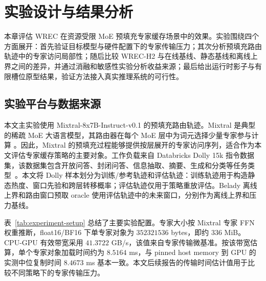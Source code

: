 \cleardoublepage


\makeatletter
{}
\makeatother

\section{实验设计与结果分析}

本章评估 WREC 在资源受限 MoE 预填充专家缓存场景中的效果。实验围绕四个方面展开：首先验证目标模型与硬件配置下的专家传输压力；其次分析预填充路由轨迹中的专家访问局部性；随后比较 WREC-H2 与在线基线、静态基线和离线上界之间的差异，并通过消融和敏感性实验分析收益来源；最后给出运行时影子与有限槽位原型结果，验证方法接入真实推理系统的可行性。

\subsection{实验平台与数据来源}

本文主实验使用 Mixtral-8x7B-Instruct-v0.1 的预填充路由轨迹。Mixtral 是典型的稀疏 MoE 大语言模型，其路由器在每个 MoE 层中为词元选择少量专家参与计算 \cite{jiang2024mixtral,mixtral,shazeer2017outrageously}。因此，Mixtral 的预填充过程能够提供按层展开的专家访问序列，适合作为本文评估专家缓存策略的主要对象。工作负载来自 Databricks Dolly 15k 指令数据集，该数据集包含开放问答、封闭问答、信息抽取、摘要、生成和分类等任务类型~\cite{databricks2023dolly}。本文将 Dolly 样本划分为训练/参考轨迹和评估轨迹：训练轨迹用于构造静态热度、窗口先验和跨层转移概率；评估轨迹仅用于策略重放评估。Belady 离线上界和路由窗口预取 oracle 使用评估轨迹中的未来窗口，分别作为离线上界和压力基线。

表~\ref{tab:experiment-setup} 总结了主要实验配置。专家大小按 Mixtral 专家 FFN 权重推断，float16/BF16 下单专家对象为 $352321536$ bytes，即约 $336$ MiB。CPU-GPU 有效带宽采用 $41.3722$ GB/s，该值来自专家传输微基准。按该带宽估算，单个专家对象加载时间约为 $8.5164$ ms，与 pinned host memory 到 GPU 的实测中位复制时间 $8.4673$ ms 基本一致。本文后续报告的传输时间估计值用于比较不同策略下的专家传输压力。

